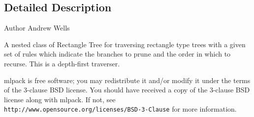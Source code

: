 \subsection{Detailed Description}
\begin{DoxyAuthor}{Author}
Andrew Wells
\end{DoxyAuthor}
A nested class of Rectangle Tree for traversing rectangle type trees with a given set of rules which indicate the branches to prune and the order in which to recurse. This is a depth-\/first traverser.

mlpack is free software; you may redistribute it and/or modify it under the terms of the 3-\/clause B\+SD license. You should have received a copy of the 3-\/clause B\+SD license along with mlpack. If not, see {\tt http\+://www.\+opensource.\+org/licenses/\+B\+S\+D-\/3-\/\+Clause} for more information. 